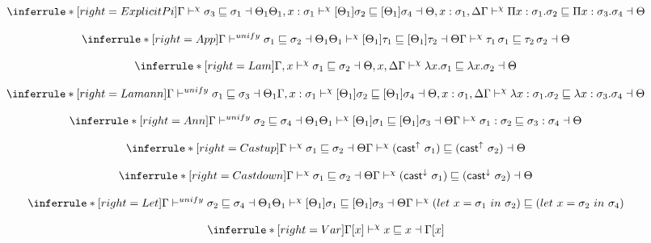 \[
\inferrule*[right=ExplicitPi]
{\Gamma \dskunify  \sigma_3 \sqsubseteq \sigma_1 \dashv \Theta_1 \\
\Theta_1, x:\sigma_1 \dskunify [\Theta_1]\sigma_2 \sqsubseteq [\Theta_1]\sigma_4 \dashv \Theta, x:\sigma_1, \Delta}
{ \Gamma \dskunify \Pi x:\sigma_1. \sigma_2 \sqsubseteq \Pi x:\sigma_3. \sigma_4 \dashv \Theta}
\]

\[
\inferrule*[right=App]
{
\Gamma \unify \sigma_1 \sqsubseteq \sigma_2 \dashv \Theta_1 \\
\Theta_1 \dskunify [\Theta_1]\tau_1 \sqsubseteq [\Theta_1]\tau_2 \dashv \Theta
}
{\Gamma \dskunify \tau_1\, \sigma_1 \sqsubseteq \tau_2\, \sigma_2 \dashv \Theta}
\]

\[
\inferrule*[right=Lam]
{
\Gamma, x \dskunify \sigma_1 \sqsubseteq \sigma_2 \dashv \Theta, x, \Delta}
{\Gamma \dskunify \lambda x. \sigma_1 \sqsubseteq \lambda x. \sigma_2 \dashv \Theta }
\]


\[
\inferrule*[right=Lamann]
{
\Gamma \unify \sigma_1 \sqsubseteq \sigma_3 \dashv \Theta_1 \\
\Gamma, x:\sigma_1 \dskunify [\Theta_1]\sigma_2 \sqsubseteq [\Theta_1]\sigma_4 \dashv \Theta, x:\sigma_1, \Delta }
{\Gamma \dskunify \lambda x:\sigma_1. \sigma_2 \sqsubseteq \lambda x:\sigma_3. \sigma_4 \dashv \Theta
}
\]

\[
\inferrule*[right=Ann]
{
\Gamma \unify \sigma_2 \sqsubseteq \sigma_4 \dashv \Theta_1 \\
\Theta_1 \dskunify  [\Theta_1]\sigma_1 \sqsubseteq [\Theta_1]\sigma_3 \dashv \Theta }
{\Gamma \dskunify \sigma_1:\sigma_2 \sqsubseteq \sigma_3:\sigma_4 \dashv \Theta}
\]

\[
\inferrule*[right=Castup]
{
\Gamma \dskunify  \sigma_1 \sqsubseteq \sigma_2 \dashv \Theta}
{\Gamma \dskunify (\castupe \sigma_1) \sqsubseteq  (\castupe \sigma_2) \dashv \Theta}
\]

\[
\inferrule*[right=Castdown]
{
\Gamma \dskunify  \sigma_1 \sqsubseteq \sigma_2 \dashv \Theta}
{\Gamma \dskunify  (\castdowne \sigma_1) \sqsubseteq  (\castdowne \sigma_2) \dashv \Theta}
\]

\[
\inferrule*[right=Let]
{
\Gamma \unify \sigma_2 \sqsubseteq \sigma_4 \dashv \Theta_1 \\
\Theta_1 \dskunify  [\Theta_1]\sigma_1 \sqsubseteq [\Theta_1]\sigma_3 \dashv \Theta }
{\Gamma \dskunify  (let\ x = \sigma_1\ in\ \sigma_2) \sqsubseteq  (let\ x = \sigma_2\ in\ \sigma_4) }
\]

\[
\inferrule*[right=Var]
{ }
{\Gamma[x] \dskunify x \sqsubseteq x \dashv \Gamma[x] }
\]

